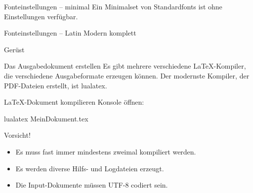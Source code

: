 \begin{frame}{Fonteinstellungen – minimal}
  Ein Minimalset von Standardfonts ist ohne Einstellungen verfügbar.
\end{frame}

\begin{frame}[fragile]{Fonteinstellungen – Latin Modern komplett}
  \begin{lstverbatim}
  \setmainfont[
    SmallCapsFont = {Latin Modern Roman Caps},
    SlantedFont = {Latin Modern Roman Slanted},
    ItalicFeatures  = {
      SmallCapsFont = {LMRomanCaps10-Oblique}
    },
    ]{Latin Modern Roman}

  \setsansfont{Latin Modern Sans}

  \setmonofont[
    SmallCapsFont = {Latin Modern Mono Caps},
    SlantedFont = {Latin Modern Mono Slanted},
    ItalicFeatures  = {
      SmallCapsFont = {LMMonoCaps10-Oblique}
    },
    ]{Latin Modern Mono}
  \end{lstverbatim}
\end{frame}

\begin{frame}[fragile]{Gerüst}
\end{frame}

\begin{frame}[fragile]{Das Ausgabedokument erstellen}
  Es gibt mehrere verschiedene \LaTeX-Kompiler, die verschiedene Ausgabeformate erzeugen können.
  Der modernste Kompiler, der PDF-Dateien erstellt, ist \alert{lualatex}.

  \begin{block}{\LaTeX-Dokument kompilieren}
    Konsole öffnen:
    \begin{lstverbatim}
    lualatex MeinDokument.tex
    \end{lstverbatim}
  \end{block}
  \begin{alertblock}{Vorsicht!}
    \begin{itemize}
      \item Es muss fast immer mindestens zweimal kompiliert werden.
      \item Es werden diverse Hilfs- und Logdateien erzeugt.
      \item Die Input-Dokumente müssen UTF-8 codiert sein.
    \end{itemize}
  \end{alertblock}
\end{frame}

